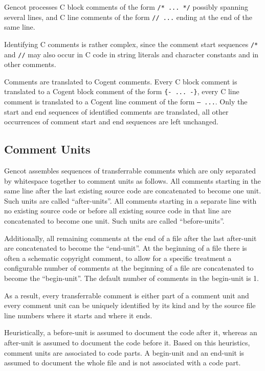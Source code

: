 \documentclass[a4paper]{report}
\newcommand{\code}[1]{\textnormal{\texttt{#1}}}
\begin{document}
Gencot processes C block comments of the form \code{/* ... */} possibly spanning several lines, and C line comments
of the form \code{// ...} ending at the end of the same line.

Identifying C comments is rather complex, since the comment start sequences \code{/*} and \code{//} may also occur
in C code in string literals and character constants and in other comments. 

Comments are translated to Cogent comments. Every C block comment is translated to a Cogent block comment of the form
\code{\{- ... -\}}, every C line comment is translated to a Cogent line comment of the form \code{-- ...}. Only the 
start and end sequences of identified comments are translated, all other occurrences of comment start and end sequences
are left unchanged.

\subsection{Comment Units}

Gencot assembles sequences of transferrable comments which are only separated by whitespace together to comment units
as follows. All comments starting in the same line after the last existing source code are concatenated to become 
one unit. Such units are called ``after-units''. All comments starting in a separate line with no existing source code 
or before all existing source code in that line are concatenated to become one unit. Such units are called ``before-units''. 

Additionally, all remaining comments at the end of a file after the last after-unit are concatenated to become the 
``end-unit''. At the beginning of a file there is often a schematic copyright comment, to allow for a specific treatment
a configurable number of comments at the beginning of a file are concatenated to become the ``begin-unit''. The default
number of comments in the begin-unit is 1.

As a result, every transferrable comment is either part of a comment unit and every comment unit
can be uniquely identified by its kind and by the source file line numbers where it starts and where it ends.

Heuristically, a before-unit is assumed to document the code after it, whereas an after-unit is assumed to document
the code before it. Based on this heuristics, comment units are associated to code parts. A begin-unit and an end-unit
is assumed to document the whole file and is not associated with a code part.
\end{document}

